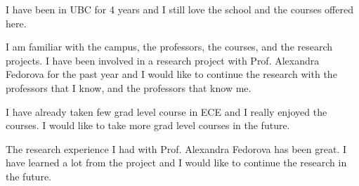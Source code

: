 I have been in UBC for 4 years and I still love the school and the courses offered here.

I am familiar with the campus, the professors, the courses, and the research projects. I have been involved in a research project with Prof. Alexandra Fedorova for the past year and I would like to continue the research with the professors that I know, and the professors that know me.

I have already taken few grad level course in ECE and I really enjoyed the courses. I would like to take more grad level courses in the future.

The research experience I had with Prof. Alexandra Fedorova has been great. I have learned a lot from the project and I would like to continue the research in the future.